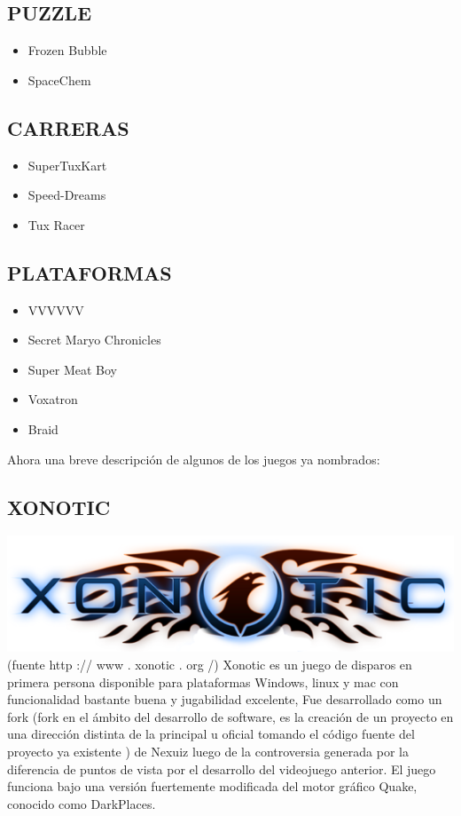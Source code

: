 \subsection*{PUZZLE}

\begin{itemize}
\item Frozen Bubble
\item SpaceChem
\end{itemize}

\subsection*{CARRERAS}

\begin{itemize}
\item SuperTuxKart
\item Speed-Dreams
\item Tux Racer
\end{itemize}

\subsection*{PLATAFORMAS}

\begin{itemize}
\item VVVVVV
\item Secret Maryo Chronicles
\item Super Meat Boy
\item Voxatron
\item Braid
\end{itemize}

Ahora una breve descripción de algunos de los juegos ya
nombrados:

\subsection*{XONOTIC}
\includegraphics[scale=0.5]{img/cp07/img0701.png}
(fuente http :// www . xonotic . org /)
Xonotic es un juego de disparos en primera persona disponible
para plataformas Windows, linux y mac con
funcionalidad bastante buena y jugabilidad
excelente, Fue desarrollado como un fork (fork
en el ámbito del desarrollo de software, es la
creación de un proyecto en una dirección distinta
de la principal u oficial tomando el código fuente
del proyecto ya existente ) de Nexuiz luego de la
controversia generada por la diferencia de
puntos de vista por el desarrollo del videojuego
anterior. El juego funciona bajo una versión
fuertemente modificada del motor gráfico Quake,
conocido como DarkPlaces.

